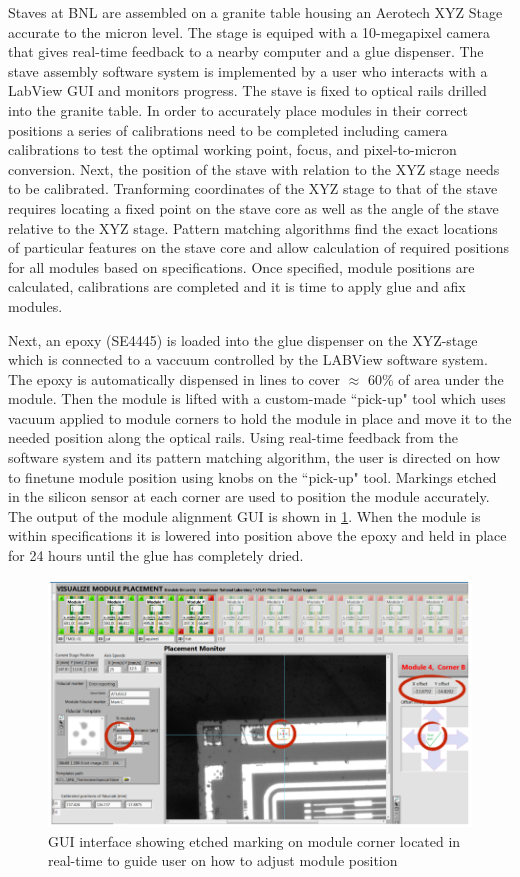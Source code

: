 Staves at BNL are assembled on a granite table housing an Aerotech XYZ Stage accurate to the micron level. The stage is equiped with a 10-megapixel camera that gives real-time feedback to a nearby computer and a glue dispenser. The stave assembly software system is implemented by a user who interacts with a LabView GUI and monitors progress. The stave is fixed to optical rails drilled into the granite table. In order to accurately place modules in their correct positions a series of calibrations need to be completed including camera calibrations to test the optimal working point, focus, and pixel-to-micron conversion. Next, the position of the stave with relation to the XYZ stage needs to be calibrated. Tranforming coordinates of the XYZ stage to that of the stave requires locating a fixed point on the stave core as well as the angle of the stave relative to the XYZ stage. Pattern matching algorithms find the exact locations of particular features on the stave core and allow calculation of required positions for all modules based on specifications. Once specified, module positions are calculated, calibrations are completed and it is time to apply glue and afix modules. 

Next, an epoxy (SE4445) is loaded into the glue dispenser on the XYZ-stage which is connected to a vaccuum controlled by the LABView software system. The epoxy is automatically dispensed in lines to cover $\approx$ 60\% of area under the module. Then the module is lifted with a custom-made ``pick-up" tool which uses vacuum applied to module corners to hold the module in place and move it to the needed position along the optical rails. Using real-time feedback from the software system and its pattern matching algorithm, the user is directed on how to finetune module position using knobs on the ``pick-up" tool. Markings etched in the silicon sensor at each corner are used to position the module accurately. The output of the module alignment GUI is shown in \ref{fig:modulealignment}. When the module is within specifications it is lowered into position above the epoxy and held in place for 24 hours until the glue has completely dried.

\begin{figure}[!h]
        \centering
    \includegraphics[width=.6\textwidth]{Pictures/labviewscreen.png}
    \caption{GUI interface showing etched marking on module corner located in real-time to guide user on how to adjust module position}
    \label{fig:modulealignment}
\end{figure}


